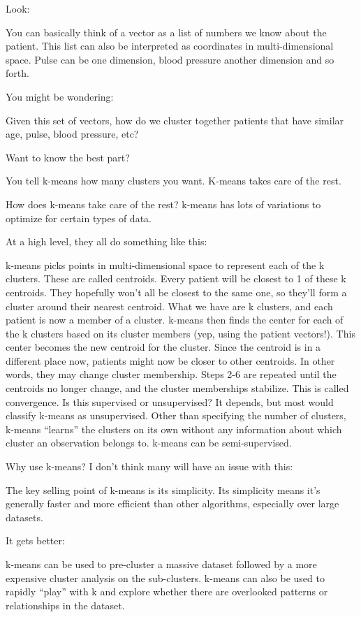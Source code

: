 Look:

You can basically think of a vector as a list of numbers we know about the patient. This list can also be interpreted as coordinates in multi-dimensional space. Pulse can be one dimension, blood pressure another dimension and so forth.

You might be wondering:

Given this set of vectors, how do we cluster together patients that have similar age, pulse, blood pressure, etc?

Want to know the best part?

You tell k-means how many clusters you want. K-means takes care of the rest.

How does k-means take care of the rest? k-means has lots of variations to optimize for certain types of data.

At a high level, they all do something like this:

k-means picks points in multi-dimensional space to represent each of the k clusters. These are called centroids.
Every patient will be closest to 1 of these k centroids. They hopefully won’t all be closest to the same one, so they’ll form a cluster around their nearest centroid.
What we have are k clusters, and each patient is now a member of a cluster.
k-means then finds the center for each of the k clusters based on its cluster members (yep, using the patient vectors!).
This center becomes the new centroid for the cluster.
Since the centroid is in a different place now, patients might now be closer to other centroids. In other words, they may change cluster membership.
Steps 2-6 are repeated until the centroids no longer change, and the cluster memberships stabilize. This is called convergence.
Is this supervised or unsupervised? It depends, but most would classify k-means as unsupervised. Other than specifying the number of clusters, k-means “learns” the clusters on its own without any information about which cluster an observation belongs to. k-means can be semi-supervised.

Why use k-means? I don’t think many will have an issue with this:

The key selling point of k-means is its simplicity. Its simplicity means it’s generally faster and more efficient than other algorithms, especially over large datasets.

It gets better:

k-means can be used to pre-cluster a massive dataset followed by a more expensive cluster analysis on the sub-clusters. k-means can also be used to rapidly “play” with k  and explore whether there are overlooked patterns or relationships in the dataset.

